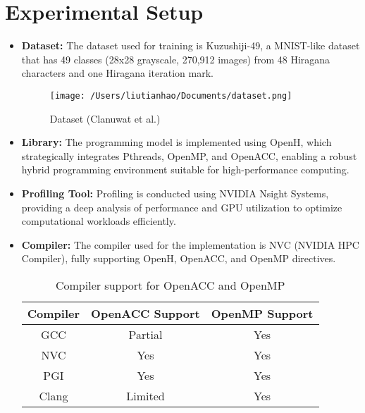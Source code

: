 \documentclass[11.5pt]{article}
\begin{document}
\section{Experimental Setup}

\begin{itemize}
    \item \textbf{Dataset:}
    The dataset used for training is Kuzushiji-49, a MNIST-like dataset that has 49 classes (28x28 grayscale, 270,912 images) from 48 Hiragana characters and one Hiragana iteration mark.

    \begin{figure}[ht]
        \centering
        \texttt{[image: /Users/liutianhao/Documents/dataset.png]}
        \caption{Dataset (Clanuwat et al.)\cite{paper4}}
        \label{fig:dataset}
    \end{figure}

    \item \textbf{Library:}
    The programming model is implemented using OpenH, which strategically integrates Pthreads, OpenMP, and OpenACC, enabling a robust hybrid programming environment suitable for high-performance computing.

    \item \textbf{Profiling Tool:}
    Profiling is conducted using NVIDIA Nsight Systems, providing a deep analysis of performance and GPU utilization to optimize computational workloads efficiently.

    \item \textbf{Compiler:}
    The compiler used for the implementation is NVC (NVIDIA HPC Compiler), fully supporting OpenH, OpenACC, and OpenMP directives.

    \begin{table}[ht]
        \centering
        \begin{tabular}{|c|c|c|}
        \hline
        \textbf{Compiler} & \textbf{OpenACC Support} & \textbf{OpenMP Support} \\
        \hline
        GCC & Partial & Yes \\ \hline
        NVC & Yes & Yes \\ \hline
        PGI & Yes & Yes \\ \hline
        Clang & Limited & Yes \\ \hline
        \end{tabular}
        \caption{Compiler support for OpenACC and OpenMP}
        \label{tab:compiler_support}
    \end{table}


\end{itemize}
\end{document}
